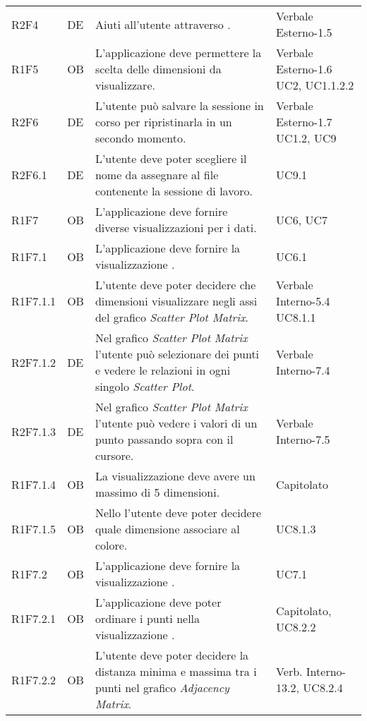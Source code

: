 {\begin{longtable}{C{2cm} | C{1.5cm} | C{9cm} | C{3.3cm}}
R2F4 & DE & Aiuti all'utente attraverso . & Verbale Esterno-1.5 \\
R1F5 & OB & L'applicazione deve permettere la scelta delle dimensioni da visualizzare. & Verbale Esterno-1.6 \newline UC2, UC1.1.2.2\\
R2F6 & DE & L'utente può salvare la sessione in corso per ripristinarla in un secondo momento. & Verbale Esterno-1.7 \newline UC1.2, UC9\\
R2F6.1 & DE & L'utente deve poter scegliere il nome da assegnare al file contenente la sessione di lavoro. & UC9.1\\
R1F7 & OB & L'applicazione deve fornire diverse visualizzazioni per i dati. & UC6, UC7\\
R1F7.1 & OB & L'applicazione deve fornire la visualizzazione . & UC6.1\\
R1F7.1.1 & OB & L'utente deve poter decidere che dimensioni visualizzare negli assi del grafico \textit{Scatter Plot Matrix}. & Verbale Interno-5.4 \newline UC8.1.1\\
R2F7.1.2 & DE & Nel grafico \textit{Scatter Plot Matrix} l'utente può selezionare dei punti e vedere le relazioni in ogni singolo \textit{Scatter Plot}. & Verbale Interno-7.4\\
R2F7.1.3 & DE & Nel grafico \textit{Scatter Plot Matrix} l'utente può vedere i valori di un punto passando sopra con il cursore. & Verbale Interno-7.5\\

R1F7.1.4 & OB & La visualizzazione  deve avere un massimo di 5 dimensioni. & Capitolato\\

R1F7.1.5 & OB & Nello  l'utente deve poter decidere quale dimensione associare al colore. & UC8.1.3\\

R1F7.2 & OB & L'applicazione deve fornire la visualizzazione . & UC7.1\\
R1F7.2.1 & OB & L'applicazione deve poter ordinare i punti nella visualizzazione . & Capitolato, UC8.2.2 \\

R1F7.2.2 & OB & L'utente deve poter decidere la distanza minima e massima tra i punti nel grafico \textit{Adjacency Matrix}. & Verb. Interno-13.2, UC8.2.4\\


\end{longtable}}
